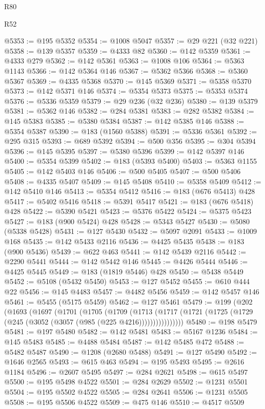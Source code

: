 \begin{lexlean}{R80}
\begin{lexlean}{R52}
\begin{coremodule}
{{{{{{{{{{{{{{{{{{{{{{{{{{{{{{{{{{{{{{{{{{{{{{{{{{{{{{{{{{{{{{{{{{{{{{{{{{{{{{{{{{{{{{{{{{{{{{{{{{{{{{{{{{{{{{{{{{{{{{{{{{{{{{{{{{{{{{{{{{{{{{{{{{{{{{{{{{{{{{{{{{{{{{{{{{{{{{{{{{{{{{{{{{{{{{{{{{{{{{@5353 := @195 @5352
@5354 := @1008 @5047
@5357 := @29 @221 (@32 @221)
@5358 := @139 @5357
@5359 := @4333 @82
@5360 := @142 @5359
@5361 := @4333 @279
@5362 := @142 @5361
@5363 := @1008 @106
@5364 := @5363 @1143
@5366 := @142 @5364 @146
@5367 := @5362 @5366
@5368 := @5360 @5367
@5369 := @4335 @5368
@5370 := @145 @5369
@5371 := @5358 @5370
@5373 := @142 @5371 @146
@5374 := @5354 @5373
@5375 := @5353 @5374
@5376 := @5336 @5359
@5379 := @29 @236 (@32 @236)
@5380 := @139 @5379
@5381 := @5362 @146
@5382 := @284 @5381
@5383 := @282 @5382
@5384 := @145 @5383
@5385 := @5380 @5384
@5387 := @142 @5385 @146
@5388 := @5354 @5387
@5390 := @183 (@1560 @5388)
@5391 := @5336 @5361
@5392 := @295 @315
@5393 := @689 @5392
@5394 := @500 @356
@5395 := @304 @5394
@5396 := @145 @5395
@5397 := @5380 @5396
@5399 := @142 @5397 @146
@5400 := @5354 @5399
@5402 := @183 (@5393 @5400)
@5403 := @5363 @1155
@5405 := @142 @5403 @146
@5406 := @500 @5405
@5407 := @500 @5406
@5408 := @4335 @5407
@5409 := @145 @5408
@5410 := @5358 @5409
@5412 := @142 @5410 @146
@5413 := @5354 @5412
@5416 := @183 (@676 @5413) @428
@5417 := @5402 @5416
@5418 := @5391 @5417
@5421 := @183 (@676 @5418) @428
@5422 := @5390 @5421
@5423 := @5376 @5422
@5424 := @5375 @5423
@5427 := @183 (@900 @5424) @428
@5428 := @5343 @5427
@5430 := @5080 (@5338 @5428)
@5431 := @127 @5430
@5432 := @5097 @2091
@5433 := @1009 @168
@5435 := @142 @5433 @2116
@5436 := @4425 @5435
@5438 := @183 (@900 @5436)
@5439 := @622 @463
@5441 := @142 @5439 @2116
@5442 := @2290 @5441
@5444 := @142 @5442 @146
@5445 := @4426 @5444
@5446 := @4425 @5445
@5449 := @183 (@1819 @5446) @428
@5450 := @5438 @5449
@5452 := @5108 (@5432 @5450)
@5453 := @127 @5452
@5455 := @610 @444 @22
@5456 := @145 @4483
@5457 := @4482 @5456
@5459 := @142 @5457 @146
@5461 := @5455 (@5175 @5459)
@5462 := @127 @5461
@5479 := @199
    (@202
      (@1693
        (@1697
          (@1701
            (@1705
              (@1709
                (@1713
                  (@1717 (@1721 (@1725 (@1729 (@245 (@3052 (@3057 (@985 (@225 @4216))))))))))))))))
@5480 := @198 @5479
@5481 := @197 @5480
@5482 := @142 @5481
@5483 := @5167 @1236
@5484 := @145 @5483
@5485 := @4488 @5484
@5487 := @142 @5485 @472
@5488 := @5482 @5487
@5490 := @1208 (@2680 @5488)
@5491 := @127 @5490
@5492 := @1646 @2565
@5493 := @615 @463
@5494 := @195 @5493
@5495 := @2616 @1184
@5496 := @2607 @5495
@5497 := @284 @2621
@5498 := @615 @5497
@5500 := @195 @5498 @4522
@5501 := @284 @2629
@5502 := @1231 @5501
@5504 := @195 @5502 @4522
@5505 := @284 @2641
@5506 := @1231 @5505
@5508 := @195 @5506 @4522
@5509 := @475 @146
@5510 := @4517 @5509
}}}}}}}}}}}}}}}}}}}}}}}}}}}}}}}}}}}}}}}}}}}}}}}}}}}}}}}}}}}}}}}}}}}}}}}}}}}}}}}}}}}}}}}}}}}}}}}}}}}}}}}}}}}}}}}}}}}}}}}}}}}}}}}}}}}}}}}}}}}}}}}}}}}}}}}}}}}}}}}}}}}}}}}}}}}}}}}}}}}}}}}}}}}}}}}}}}}}}}
\end{coremodule}
\end{lexlean}
\end{lexlean}
